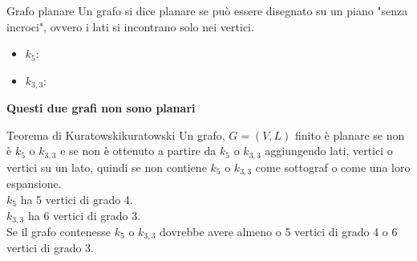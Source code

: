 \documentclass[12pt, letterpaper]{report}
\newcounter{theorem}
\newcounter{definition}
\newcommand{\nmu}{}
\begin{document}
    \begin{definition}{\nmu Grafo planare}
    	Un grafo si dice planare se può essere disegnato su un piano "senza incroci", ovvero i lati si incontrano solo nei vertici.
    \end{definition}
    \begin{itemize}
    	\item $k_5$: \\
    	\item $k_{3,3}$: \\

    \end{itemize}
    \textbf{Questi due grafi non sono planari}
    \begin{theorem}{\nmu Teorema di Kuratowski}{kuratowski}
    	Un grafo, $G = (V, L)$ finito è planare se non è $k_5$ o $k_{3,3}$ e se non è ottenuto a partire da $k_5$ o $k_{3,3}$ aggiungendo lati, vertici o vertici su un lato, quindi se non contiene $k_5$ o $k_{3, 3}$ come sottograf o come una loro espansione. \\
    	$k_5$ ha 5 vertici di grado 4. \\
    	$k_{3,3}$ ha 6 vertici di grado 3. \\
    	Se il grafo contenesse $k_5$ o $k_{3,3}$ dovrebbe avere almeno o 5 vertici di grado 4 o 6 vertici di grado 3.
    \end{theorem}
\end{document}
